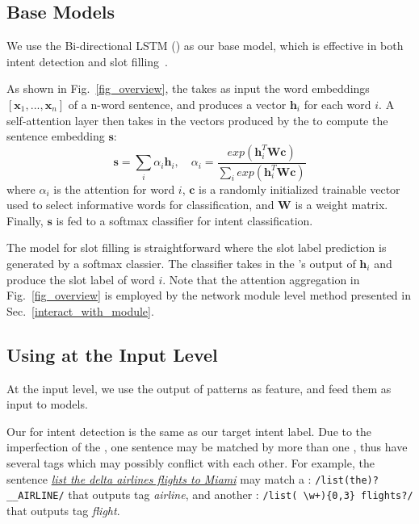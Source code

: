 \subsection{Base Models}
We use the Bi-directional LSTM (\BLSTM) as our base \NN model, which is effective in both intent detection and slot
filling~\cite{liu2016attention}.

 As shown in Fig.~\ref{fig_overview}, the \BLSTM takes as input the word embeddings $[\textbf{x}_1, ...,
\textbf{x}_n]$ of a n-word sentence, and produces a vector $\textbf{h}_i$ for each word $i$. A self-attention layer then takes in the
vectors produced by the \BLSTM to compute the sentence embedding $\textbf{s}$:
\begin{equation}
\textbf{s} = \sum_{i}{\alpha_i\textbf{h}_i}, \quad \alpha_i=\frac{exp(\textbf{h}_i^T\textbf{Wc})}{\sum_{i}{exp(\textbf{h}_i^T\textbf{Wc})}}
\label{eq:simple_att}
\end{equation}
where  $\alpha_i$ is the attention for word $i$, $\textbf{c}$ is a randomly initialized trainable vector used to select informative words for classification, and $\textbf{W}$ is a weight matrix.
Finally, $\textbf{s}$ is fed to a softmax classifier for intent classification.

 The model for slot filling is  straightforward where the slot label prediction is generated by a softmax
classier.  The classifier takes in the \BLSTM's output of $\textbf{h}_i$ and produce the slot label of word $i$. Note that the attention
aggregation in Fig.~\ref{fig_overview} is employed by the network module level method presented in Sec.~\ref{interact_with_module}.


\subsection{Using \REs at the Input Level}
\label{fusion_with_input}
At the input level, we use the output of \RE patterns as feature, and feed them as input to \NN models.

Our \REtag for intent detection is the same as our target intent label.
Due to the imperfection of the \REs, one sentence may be matched by more than one \REs, thus have several \RE tags which may possibly conflict with each other. For example, the
sentence \textsl{\underline{list the delta airlines flights to Miami}} may match a \RE: {\small \texttt{/list(\;the)?\;\_\_AIRLINE/}} that outputs
tag \emph{airline}, and another \RE: {\small \texttt{/list(\,\textbackslash w+)\{0,3\} flights?/}} that outputs tag \emph{flight}.

